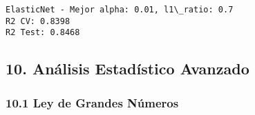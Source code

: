 \documentclass[11pt]{article}
\begin{document}
    \begin{Verbatim}[commandchars=\\\{\}]
ElasticNet - Mejor alpha: 0.01, l1\_ratio: 0.7
R2 CV: 0.8398
R2 Test: 0.8468
    \end{Verbatim}

    \subsection{10. Análisis Estadístico
Avanzado}\label{anuxe1lisis-estaduxedstico-avanzado}

    \subsubsection{10.1 Ley de Grandes
Números}\label{ley-de-grandes-nuxfameros}
\end{document}
